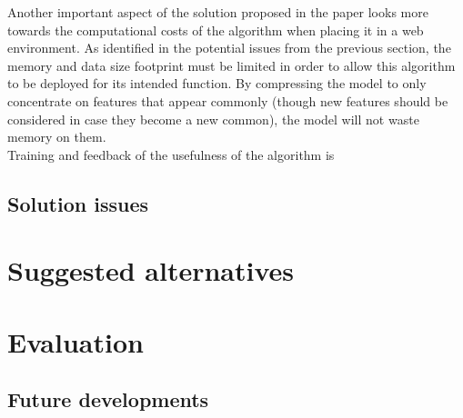 \documentclass[journal]{IEEEtran}
\begin{document}
Another important aspect of the solution proposed in the paper looks more towards the computational costs of the algorithm when placing it in a web environment. As identified in the potential issues from the previous section, the memory and data size footprint must be limited in order to allow this algorithm to be deployed for its intended function. By compressing the model to only concentrate on features that appear commonly (though new features should be considered in case they become a new common), the model will not waste memory on them. \\
Training and feedback of the usefulness of the algorithm is 


\subsection{Solution issues}
\section{Suggested alternatives}
\section{Evaluation}
\subsection{Future developments}

\appendices

\ifCLASSOPTIONcaptionsoff
  \newpage
\fi
\end{document}
